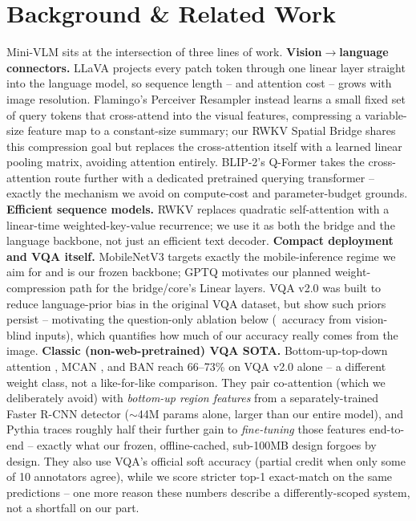 \documentclass[final]{article}
\begin{document}
\section*{Background \& Related Work}

Mini-VLM sits at the intersection of three lines of work. \textbf{Vision$\to$language
connectors.} LLaVA \citep{liu2023llava} projects every patch token through one linear layer
straight into the language model, so sequence length -- and attention cost -- grows with image
resolution. Flamingo's Perceiver Resampler \citep{alayrac2022flamingo} instead learns a small
fixed set of query tokens that cross-attend into the visual features, compressing a variable-size
feature map to a constant-size summary; our RWKV Spatial Bridge shares this compression goal but
replaces the cross-attention itself with a learned linear pooling matrix, avoiding attention
entirely. BLIP-2's Q-Former \citep{li2023blip2} takes the cross-attention route further with a
dedicated pretrained querying transformer -- exactly the mechanism we avoid on compute-cost and
parameter-budget grounds. \textbf{Efficient sequence models.} RWKV \citep{peng2023rwkv} replaces
quadratic self-attention with a linear-time weighted-key-value recurrence; we use it as both the
bridge and the language backbone, not just an efficient text decoder. \textbf{Compact deployment
and VQA itself.} MobileNetV3 \citep{howard2019mobilenetv3} targets exactly the mobile-inference
regime we aim for and is our frozen backbone; GPTQ \citep{frantar2023gptq} motivates our planned
weight-compression path for the bridge/core's Linear layers. VQA v2.0 \citep{goyal2017vqa} was
built to reduce language-prior bias in the original VQA dataset, but \citet{agrawal2018dontassume}
show such priors persist -- motivating the question-only ablation below (\blindFloor\ accuracy
from vision-blind inputs), which quantifies how much of our accuracy really comes from the image.
\textbf{Classic (non-web-pretrained) VQA SOTA.} Bottom-up-top-down attention
\citep{anderson2018bottomup}, MCAN \citep{yu2019mcan}, and BAN \citep{kim2018ban} reach 66--73\% on
VQA v2.0 alone -- a different weight class, not a like-for-like comparison. They pair co-attention
(which we deliberately avoid) with \emph{bottom-up region features} from a separately-trained
Faster R-CNN detector ($\sim$44M params alone, larger than our entire model), and Pythia
\citep{jiang2018pythia} traces roughly half their further gain to \emph{fine-tuning} those features
end-to-end -- exactly what our frozen, offline-cached, sub-100MB design forgoes by design. They
also use VQA's official soft accuracy (partial credit when only some of 10 annotators agree),
while we score stricter top-1 exact-match on the same predictions -- one more reason these numbers
describe a differently-scoped system, not a shortfall on our part.
\end{document}
